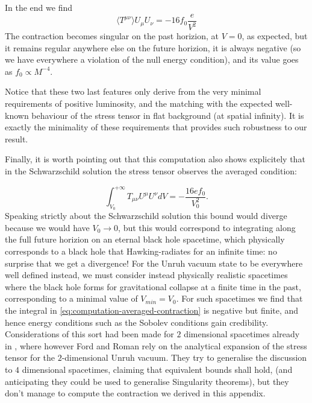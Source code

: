 In the end we find
\begin{equation}
    \label{eq:contraction-stress-tensor}
    \langle T^{\mu\nu}\rangle U_{\mu}U_{\nu} =  -16f_0\frac{e}{V^2}
\end{equation}
The contraction becomes singular on the past horizion, at \(V = 0\), as expected, but it remains regular anywhere else on the future horizion, it is always negative (so we have everywhere a violation of the null energy condition), and its value goes as \(f_0 \propto M^{-4}\). 

Notice that these two last features only derive from the very minimal requirements of positive luminosity, and the matching with the expected well-known behaviour of the stress tensor in flat background (at spatial infinity). It is exactly the minimality of these requirements that provides such robustness to our result.

Finally, it is worth pointing out that this computation also shows explicitely that in the Schwarzschild solution the stress tensor observes the averaged condition:

\begin{equation}
    \label{eq:computation-averaged-contraction}
    \int_{V_0}^{+\infty} T_{\mu\nu}U^{\mu}U^{\nu} dV = - \frac{16ef_0}{V_0^2}.
\end{equation}
Speaking strictly about the Schwarzschild solution this bound would diverge because we would have \(V_0\rightarrow 0\), but this would correspond to integrating along the full future horizion on an eternal black hole spacetime, which physically corresponds to a black hole that Hawking-radiates for an infinite time: no surprise that we get a divergence!
For the Unruh vacuum state to be everywhere well defined instead, we must consider instead physically realistic spacetimes where the black hole forms for gravitational collapse at a finite time in the past, corresponding to a minimal value of \(V_{min} = V_0\). For such spacetimes we find that the integral in  \eqref{eq:computation-averaged-contraction} is negative but finite, and hence energy conditions such as the Sobolev conditions gain credibility.
Considerations of this sort had been made for \(2\) dimensional spacetimes already in \cite[]{ford1996averaged}, where however Ford and Roman rely on the analytical expansion of the stress tensor for the \(2\)-dimensional Unruh vacuum. They try to generalise the discussion to \(4\) dimensional spacetimes, claiming that equivalent bounds shall hold, (and anticipating they could be used to generalise Singularity theorems), but they don't manage to compute the contraction we derived in this appendix.

